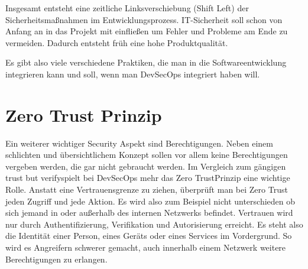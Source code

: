 Insgesamt entsteht eine zeitliche Linksverschiebung (Shift Left) der Sicherheitsmaßnahmen im Entwicklungsprozess. IT-Sicherheit soll schon von Anfang an in das Projekt mit einfließen um Fehler und Probleme am Ende zu vermeiden. Dadurch entsteht früh eine hohe Produktqualität. \cite{Luber2022-xh}

Es gibt also viele verschiedene Praktiken, die man in die Softwareentwicklung integrieren kann und soll, wenn man DevSecOps integriert haben will.

\section{Zero Trust Prinzip}
Ein weiterer wichtiger Security Aspekt sind Berechtigungen. Neben einem schlichten und übersichtlichem Konzept sollen vor allem keine Berechtigungen vergeben werden, die gar nicht gebraucht werden. Im Vergleich zum gängigen \glqq trust but verify\grqq\enspace spielt bei DevSecOps mehr das \glqq Zero Trust\grqq\enspace Prinzip eine wichtige Rolle. Anstatt eine Vertrauensgrenze zu ziehen, überprüft man bei Zero Trust jeden Zugriff und jede Aktion. Es wird also zum Beispiel nicht unterschieden ob sich jemand in oder außerhalb des internen Netzwerks befindet. Vertrauen wird nur durch Authentifizierung, Verifikation und Autorisierung erreicht. Es steht also die Identität einer Person, eines Geräts oder eines Services im Vordergrund. So wird es Angreifern schwerer gemacht, auch innerhalb einem Netzwerk weitere Berechtigungen zu erlangen. \cite{zero-trust}


